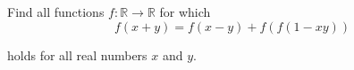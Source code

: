 Find all functions $f : \mathbb{R} \rightarrow \mathbb{R}$ for which\[f(x + y) = f(x - y) + f(f(1 - xy))\]

holds for all real numbers $x$ and $y$.